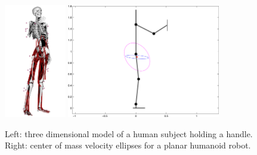 \documentclass[final,5p,twocolumn]{elsarticle}
\begin{document}

\begin{figure}
	\begin{center}
		\includegraphics[height=5cm]{images/skeleton_v1.png}
		\includegraphics[height=5cm]{images/ellipses.pdf}
		\caption{Left: three dimensional model of a human subject holding a handle. Right: center of mass velocity ellipses for a planar humanoid robot.}
		\label{fig:skeleton_ellipses}
	\end{center}
\end{figure}
\end{document}

